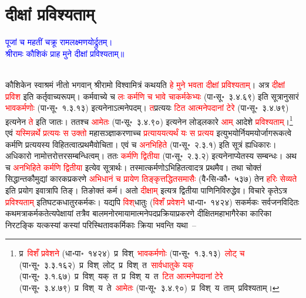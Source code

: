 \section[दीक्षां प्रविश्यताम्]{दीक्षां प्रविश्यताम्‌}
\centering\textcolor{blue}{पूजां च महतीं चक्रू रामलक्ष्मणयोर्द्रुतम्।\nopagebreak\\
श्रीरामः कौशिकं प्राह मुने दीक्षां प्रविश्यताम्॥}\nopagebreak\\
\\
\begin{sloppypar}\justifying\noindent\hspace{10mm} कौशिकेन स्वाश्रमं नीतो भगवान् श्रीरामो विश्वामित्रं कथयति \textcolor{red}{हे मुने भवता दीक्षां प्रविश्यताम्‌}। अत्र \textcolor{red}{दीक्षां प्रविश} इति कर्तृ\-वाच्य\-रूपम्। कर्म\-वाच्ये च \textcolor{red}{लः कर्मणि च भावे चाकर्मकेभ्यः} (पा॰सू॰~३.४.६९) इति सूत्रानुसारं \textcolor{red}{भाव\-कर्मणोः} (पा॰सू॰~१.३.१३) इत्यनेनाऽत्मने\-पदम्। \textcolor{red}{त}\-प्रत्ययः \textcolor{red}{टित आत्मनेपदानां टेरे} (पा॰सू॰~३.४.७९) इत्यनेन \textcolor{red}{ते} इति जातः। ततश्च \textcolor{red}{आमेतः} (पा॰सू॰~३.४.९०) इत्यनेन लोड्लकारे \textcolor{red}{आम्‌} आदेशे \textcolor{red}{प्रविश्यताम्‌}।\footnote{प्र~\textcolor{red}{विशँ प्रवेशने} (धा॰पा॰~१४२४)~\arrow प्र~विश्~\arrow \textcolor{red}{भाव\-कर्मणोः} (पा॰सू॰~१.३.१३)~\arrow \textcolor{red}{लोट् च} (पा॰सू॰~३.३.१६२)~\arrow प्र~विश्~लोट्~\arrow प्र~विश्~त~\arrow \textcolor{red}{सार्वधातुके यक्‌} (पा॰सू॰~३.१.६७)~\arrow प्र~विश्~यक्~त~\arrow प्र~विश्~य~त~\arrow \textcolor{red}{टित आत्मनेपदानां टेरे} (पा॰सू॰~३.४.७९)~\arrow प्र~विश्~य~ते~\arrow \textcolor{red}{आमेतः} (पा॰सू॰~३.४.९०)~\arrow प्र~विश्~य~ताम्~\arrow प्रविश्यताम्।} एवं \textcolor{red}{यस्मिन्नर्थे प्रत्ययः स उक्तो} महा\-सञ्ज्ञा\-करणाच्च \textcolor{red}{प्रत्याययत्यर्थं यः स प्रत्यय} इत्युभयोर्नियमयोर्जागरूकत्वे कर्मणि प्रत्ययस्य विहितत्वात्प्रथमैवोचिता। एवं च \textcolor{red}{अनभिहिते} (पा॰सू॰~२.३.१) इति सूत्रं ह्यधिकारः। अधिकारो नामोत्तरोत्तर\-सम्बन्धित्वम्। ततः \textcolor{red}{कर्मणि द्वितीया} (पा॰सू॰~२.३.२) इत्यनेनाप्येतस्य सम्बन्धः। अथ च \textcolor{red}{अनभिहिते कर्मणि द्वितीया} इत्येव सूत्रार्थः। तस्मात्कर्मणोऽभिहितत्वादत्र प्रथमैव। तथा चोक्तं सिद्धान्त\-कौमुद्यां कारक\-प्रकरणे \textcolor{red}{अभिधानं च प्रायेण तिङ्कृत्तद्धित\-समासैः} (वै॰सि॰कौ॰~५३७) तेन \textcolor{red}{हरिः सेव्यते} इति प्रयोग इवात्रापि तिङ्। तिङोक्तं कर्म। अतो \textcolor{red}{दीक्षाम्‌} इत्यत्र द्वितीया पाणिनि\-विरुद्धेव। विचारे कृतेऽत्र \textcolor{red}{प्रविश्यताम्‌} इतिघटक\-धातुरकर्मकः। यद्यपि \textcolor{red}{विश्‌}\-धातुः (\textcolor{red}{विशँ प्रवेशने} धा॰पा॰~१४२४) सकर्मकः सर्व\-जन\-विदितः कथमत्राकर्मकतेत्यपेक्षायां तत्रैव बाल\-मनोरमायामात्मनेपद\-प्रक्रिया\-प्रकरणे दीक्षित\-महाभागैरेका कारिका निरटङ्कि यत्कस्यां कस्यां परिस्थितावकर्मिकाः क्रिया भवन्ति यथा~–\end{sloppypar}
